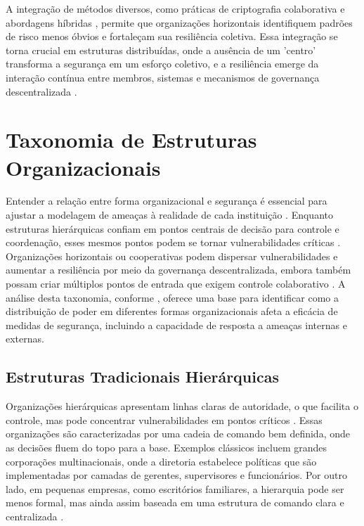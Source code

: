 A integração de métodos diversos, como práticas de criptografia
colaborativa \cite{AbcCrypto} e abordagens híbridas \cite{CoReTM}, permite
que organizações horizontais identifiquem padrões de risco menos óbvios e
fortaleçam sua resiliência coletiva. Essa integração se torna crucial em
estruturas distribuídas, onde a ausência de um 'centro' transforma a
segurança em um esforço coletivo, e a resiliência emerge da interação
contínua entre membros, sistemas e mecanismos de governança
descentralizada \cite{Reputation-basedDAO}.

\section{Taxonomia de Estruturas Organizacionais}
\label{sec:taxonomia_de_estruturas_organizacionais}

Entender a relação entre forma organizacional e segurança é essencial para
ajustar a modelagem de ameaças à realidade de cada instituição \cite{Non-HierarchicalForms}.
Enquanto estruturas hierárquicas confiam em pontos centrais de decisão para controle
e coordenação, esses mesmos pontos podem se tornar vulnerabilidades
críticas \cite{ThreatModelingdesigningForSecurity}. Organizações horizontais ou cooperativas podem
dispersar vulnerabilidades e aumentar a resiliência por meio da governança
descentralizada, embora também possam criar múltiplos pontos de entrada que
exigem controle colaborativo \cite{Colbac}. A análise desta taxonomia, conforme
\cite{WorkerCooperativesinAmerica, RealNotNominalGlobalDemocracy}, oferece
uma base para identificar como a distribuição de poder em diferentes formas
organizacionais afeta a eficácia de medidas de segurança, incluindo a
capacidade de resposta a ameaças internas e externas.

\subsection{Estruturas Tradicionais Hierárquicas}
\label{sec:estruturas_tradicionais_hierarquicas}

Organizações hierárquicas apresentam linhas claras de autoridade, o que
facilita o controle, mas pode concentrar vulnerabilidades em pontos
críticos \cite{DoArtifactsHavePolitics}. Essas organizações são caracterizadas por uma cadeia de comando
bem definida, onde as decisões fluem do topo para a base. Exemplos
clássicos incluem grandes corporações multinacionais, onde a diretoria
estabelece políticas que são implementadas por camadas de gerentes,
supervisores e funcionários. Por outro lado, em pequenas empresas, como
escritórios familiares, a hierarquia pode ser menos formal, mas ainda assim
baseada em uma estrutura de comando clara e centralizada \cite{WorkerCooperativesinAmerica}.


